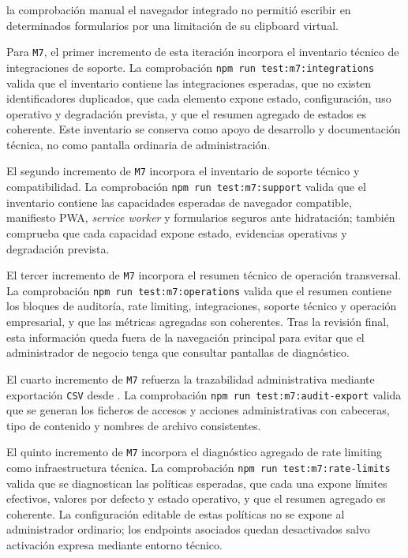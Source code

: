 la comprobación manual el navegador integrado no permitió escribir en determinados formularios por una limitación de su clipboard virtual.

Para \texttt{M7}, el primer incremento de esta iteración incorpora el inventario técnico de integraciones de soporte. La comprobación \texttt{npm run test:m7:integrations} valida que el inventario contiene las integraciones esperadas, que no existen identificadores duplicados, que cada elemento expone estado, configuración, uso operativo y degradación prevista, y que el resumen agregado de estados es coherente. Este inventario se conserva como apoyo de desarrollo y documentación técnica, no como pantalla ordinaria de administración.

El segundo incremento de \texttt{M7} incorpora el inventario de soporte técnico y compatibilidad. La comprobación \texttt{npm run test:m7:support} valida que el inventario contiene las capacidades esperadas de navegador compatible, manifiesto PWA, \textit{service worker} y formularios seguros ante hidratación; también comprueba que cada capacidad expone estado, evidencias operativas y degradación prevista.

El tercer incremento de \texttt{M7} incorpora el resumen técnico de operación transversal. La comprobación \texttt{npm run test:m7:operations} valida que el resumen contiene los bloques de auditoría, rate limiting, integraciones, soporte técnico y operación empresarial, y que las métricas agregadas son coherentes. Tras la revisión final, esta información queda fuera de la navegación principal para evitar que el administrador de negocio tenga que consultar pantallas de diagnóstico.

El cuarto incremento de \texttt{M7} refuerza la trazabilidad administrativa mediante exportación \texttt{CSV} desde . La comprobación \texttt{npm run test:m7:audit-export} valida que se generan los ficheros de accesos y acciones administrativas con cabeceras, tipo de contenido y nombres de archivo consistentes.

El quinto incremento de \texttt{M7} incorpora el diagnóstico agregado de rate limiting como infraestructura técnica. La comprobación \texttt{npm run test:m7:rate-limits} valida que se diagnostican las políticas esperadas, que cada una expone límites efectivos, valores por defecto y estado operativo, y que el resumen agregado es coherente. La configuración editable de estas políticas no se expone al administrador ordinario; los endpoints asociados quedan desactivados salvo activación expresa mediante entorno técnico.

